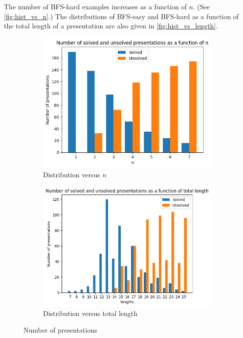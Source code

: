 The number of BFS-hard examples increases as a function of $n$.
(See \autoref{fig:hist_vs_n}.)
The distributions of BFS-easy and BFS-hard as a function of the total length of a presentation are also given in \autoref{fig:hist_vs_length}.

\begin{figure}
	\centering
	\begin{subfigure}[b]{0.5\textwidth}
		\includegraphics[width=\textwidth]{fig/hist_vs_n.png}
		\caption{Distribution versus $n$}
		\label{fig:hist_vs_n}
	\end{subfigure}%
	\begin{subfigure}[b]{0.5\textwidth}
		\centering
		\includegraphics[width=\textwidth]{fig/hist_vs_lengths.png}
		\caption{Distribution versus total length}
		\label{fig:hist_vs_length}
	\end{subfigure}
	\caption{Number of presentations}\label{fig:miller_schupp_statistics}
\end{figure}